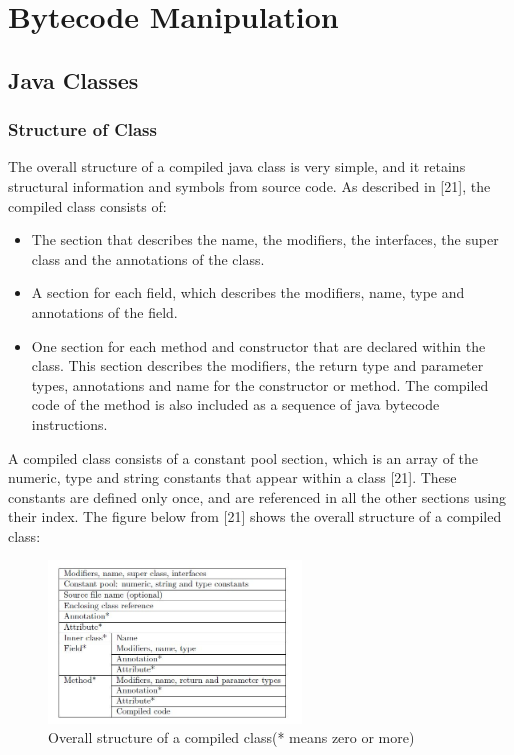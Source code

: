 \chapter{Bytecode Manipulation}


\section{Java Classes}
\subsection{Structure of Class}
The overall structure of a compiled java class is very simple, and it retains structural information and symbols from source code. As described in [21], the compiled class consists of:
\begin{itemize}
\item The section that describes the name, the modifiers, the interfaces, the super class and the annotations of the class.
\item A section for each field, which describes the modifiers, name, type and annotations of the field. 
\item One section for each method and constructor that are declared within the class. This section describes the modifiers, the return type and  parameter types, annotations and name for the constructor or method. The compiled code of the method is also included as a sequence of java bytecode instructions.
\end{itemize}

A compiled class consists of a constant pool section, which is an array of the numeric, type and string constants that appear within a class [21]. These constants are defined only once, and are referenced in all the other sections using their index. The figure below from [21] shows the overall structure of a compiled class:

\begin{figure}[htb]
\centering
\includegraphics[width=0.6\textwidth]{images/class_structure.jpg}
\caption{Overall structure of a compiled class(* means zero or more)} 
\label{fig: Overall structure of a compiled class(* means zero or more)}
\end{figure}  
\break


